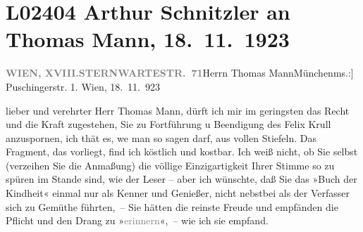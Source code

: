 

\section[Arthur Schnitzler an Thomas Mann, 18. 11. 1923]{L02404 Arthur Schnitzler an Thomas Mann, 18. 11. 1923}
\nopagebreak{}
\rehead{ }\normalsize\beginnumbering{}
\toendnotes[C]{\smallbreak\pagebreak[2]}
\toendnotes[C]{\smallbreak}\pstart{}{\pb}\label{T_L02404-1v}\label{T_L02404-1}\pend{}\pstart{}\textcolor{gray}{\textbf{WIEN, XVIII.}}\pend{}\pstart{}\textcolor{gray}{\textbf{STERNWARTESTR. 71}}\pend{}{\bigskip}\pstart{}{\pb}Herrn Thomas Mann\pend{}\pstart{}München\pend{}\pstart{}\strikeout{Puch}{ }{[}ms.:{]} Puschingerstr. 1. \pend{}{\bigskip}\vspace{1em}
\pstart
           \raggedleft{}{\pb}Wien, 18. 11. 923\pend
           
\pstart{}lieber und verehrter Herr Thomas Mann,\pend\vspace{0.5em}
\pstart
           dürft ich mir im geringsten das Recht und die Kraft zugestehen, Sie zu Fortführung u
               Beendigung des Felix Krull anzuspornen, ich thät
               es, we{\geminationn} man so sagen darf, aus vollen Stiefeln. Das Fragment, das vorliegt, find
               ich köstlich und kostbar. Ich weiß nicht, ob Sie selbst (verzeihen Sie die Anmaßung)
               die völlige Einzigartigkeit Ihrer Stimme so zu spüren im Stande sind, wie der Leser –
               aber ich wünschte, daß Sie das »Buch der Kindheit« einmal nur als Kenner und
               Genießer, nicht nebstbei als der Verfasser sich zu Gemüthe führten, – Sie hätten die
               reinste Freude und empfänden die Pflicht und den Drang zu
                  »\textcolor{gray}{erinnern}«, – wie ich sie empfand.\pend
           
